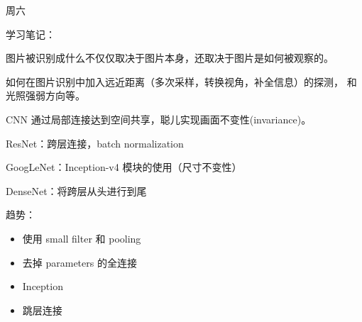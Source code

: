 

周六

学习笔记：

图片被识别成什么不仅仅取决于图片本身，还取决于图片是如何被观察的。

如何在图片识别中加入远近距离（多次采样，转换视角，补全信息）的探测，
和光照强弱方向等。

CNN 通过局部连接达到空间共享，聪儿实现画面不变性(invariance)。

ResNet：跨层连接，batch normalization

GoogLeNet：Inception-v4 模块的使用（尺寸不变性）

DenseNet：将跨层从头进行到尾

趋势：
\begin{itemize}
    \item 使用 small filter 和 pooling
    \item 去掉 parameters 的全连接
    \item Inception
    \item 跳层连接
\end{itemize}
